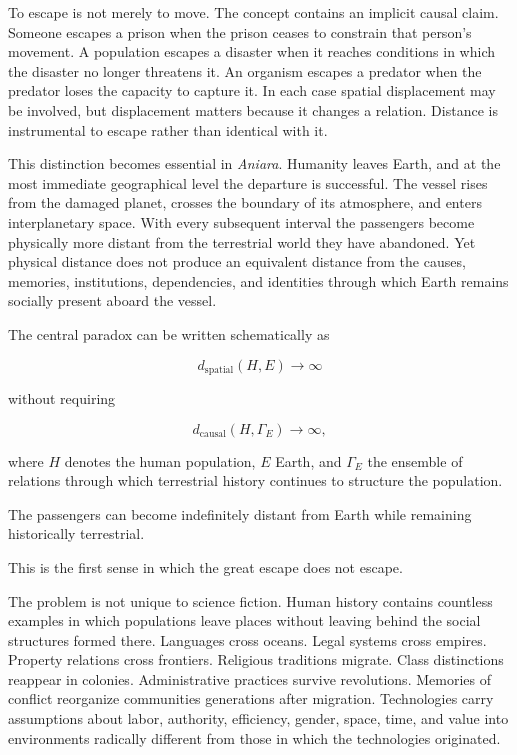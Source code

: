 \documentclass[11pt,oneside]{book}
\theoremstyle{definition}
\theoremstyle{remark}
\begin{document}
To escape is not merely to move. The concept contains an implicit causal claim. Someone escapes a prison when the prison ceases to constrain that person's movement. A population escapes a disaster when it reaches conditions in which the disaster no longer threatens it. An organism escapes a predator when the predator loses the capacity to capture it. In each case spatial displacement may be involved, but displacement matters because it changes a relation. Distance is instrumental to escape rather than identical with it.

This distinction becomes essential in \emph{Aniara}. Humanity leaves Earth, and at the most immediate geographical level the departure is successful. The vessel rises from the damaged planet, crosses the boundary of its atmosphere, and enters interplanetary space. With every subsequent interval the passengers become physically more distant from the terrestrial world they have abandoned. Yet physical distance does not produce an equivalent distance from the causes, memories, institutions, dependencies, and identities through which Earth remains socially present aboard the vessel.

The central paradox can be written schematically as

\[
d_{\mathrm{spatial}}(H,E)\rightarrow\infty
\]

without requiring

\[
d_{\mathrm{causal}}(H,\Gamma_E)\rightarrow\infty,
\]

where \(H\) denotes the human population, \(E\) Earth, and \(\Gamma_E\) the ensemble of relations through which terrestrial history continues to structure the population.

The passengers can become indefinitely distant from Earth while remaining historically terrestrial.

This is the first sense in which the great escape does not escape.

The problem is not unique to science fiction. Human history contains countless examples in which populations leave places without leaving behind the social structures formed there. Languages cross oceans. Legal systems cross empires. Property relations cross frontiers. Religious traditions migrate. Class distinctions reappear in colonies. Administrative practices survive revolutions. Memories of conflict reorganize communities generations after migration. Technologies carry assumptions about labor, authority, efficiency, gender, space, time, and value into environments radically different from those in which the technologies originated.
\end{document}
